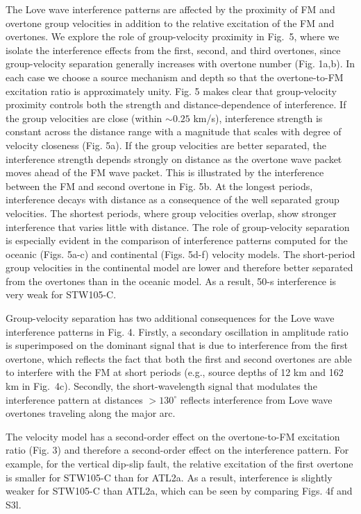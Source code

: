 \documentclass[extra,mreferee]{gji}
\begin{document}
The Love wave interference patterns are affected by the proximity of FM and overtone group velocities in addition to the relative excitation of the FM and overtones. We explore the role of group-velocity proximity in Fig.\ 5, where we isolate the interference effects from the first, second, and third overtones, since group-velocity separation generally increases with overtone number (Fig. 1a,b). In each case we choose a source mechanism and depth so that the overtone-to-FM excitation ratio is approximately unity. Fig. 5 makes clear that group-velocity proximity controls both the strength and distance-dependence of interference. If the group velocities are close (within $ \sim 0.25$ km/s), interference strength is constant across the distance range with a magnitude that scales with degree of velocity closeness (Fig. 5a). If the group velocities are better separated, the interference strength depends strongly on distance as the overtone wave packet moves ahead of the FM wave packet. This is illustrated by the interference between the FM and second overtone in Fig. 5b. At the longest periods, interference decays with distance as a consequence of the well separated group velocities. The shortest periods, where group velocities overlap, show stronger interference that varies little with distance. The role of group-velocity separation is especially evident in the comparison of interference patterns computed for the oceanic (Figs. 5a-c) and continental (Figs. 5d-f) velocity models. The short-period group velocities in the continental model are lower and therefore better separated from the overtones than in the oceanic model. As a result, 50-s interference is very weak for STW105-C.

Group-velocity separation has two additional consequences for the Love wave interference patterns in Fig. 4. Firstly, a secondary oscillation in amplitude ratio is superimposed on the dominant signal that is due to interference from the first overtone, which reflects the fact that both the first and second overtones are able to interfere with the FM at short periods (e.g., source depths of 12 km and 162 km in Fig.\ 4c). Secondly, the short-wavelength signal that modulates the interference pattern at distances $> 130^\circ$  reflects interference from Love wave overtones traveling along the major arc.

The velocity model has a second-order effect on the overtone-to-FM excitation ratio (Fig. 3) and therefore a second-order effect on the interference pattern. For example, for the vertical dip-slip fault, the relative excitation of the first overtone is smaller for STW105-C than for ATL2a. As a result, interference is slightly weaker for STW105-C than ATL2a, which can be seen by comparing Figs. 4f and S3l.
\end{document}
